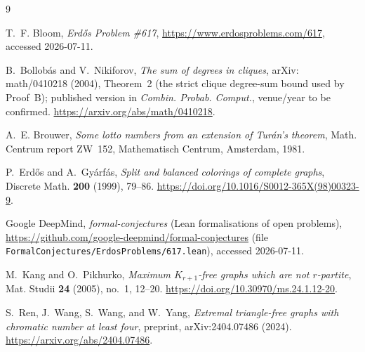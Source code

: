 \documentclass[11pt,reqno]{amsart}
\theoremstyle{definition}
\theoremstyle{remark}
\begin{document}
\begin{thebibliography}{9}

T.~F. Bloom,
\emph{Erd\H{o}s Problem \#617},
\url{https://www.erdosproblems.com/617}, accessed 2026-07-11.

B.~Bollob\'as and V.~Nikiforov,
\emph{The sum of degrees in cliques},
arXiv:\,math/0410218 (2004), Theorem~2 (the strict clique degree-sum bound used by
Proof~B); published version in \emph{Combin. Probab. Comput.}, venue/year to be confirmed.
\url{https://arxiv.org/abs/math/0410218}.

A.~E. Brouwer,
\emph{Some lotto numbers from an extension of Tur\'an's theorem},
Math. Centrum report ZW~152, Mathematisch Centrum, Amsterdam, 1981.

P.~Erd\H{o}s and A.~Gy\'arf\'as,
\emph{Split and balanced colorings of complete graphs},
Discrete Math. \textbf{200} (1999), 79--86.
\url{https://doi.org/10.1016/S0012-365X(98)00323-9}.

Google DeepMind,
\emph{formal-conjectures} (Lean formalisations of open problems),
\url{https://github.com/google-deepmind/formal-conjectures}
(file \texttt{FormalConjectures/ErdosProblems/617.lean}), accessed 2026-07-11.

M.~Kang and O.~Pikhurko,
\emph{Maximum $K_{r+1}$-free graphs which are not $r$-partite},
Mat. Studii \textbf{24} (2005), no.~1, 12--20.
\url{https://doi.org/10.30970/ms.24.1.12-20}.

S.~Ren, J.~Wang, S.~Wang, and W.~Yang,
\emph{Extremal triangle-free graphs with chromatic number at least four},
preprint, arXiv:2404.07486 (2024).
\url{https://arxiv.org/abs/2404.07486}.

\end{thebibliography}
\end{document}
